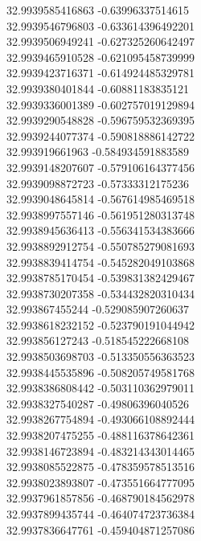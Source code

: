 {32.9939585416863	-0.63996337514615\\
32.9939546796803	-0.633614396492201\\
32.9939506949241	-0.627325260642497\\
32.9939465910528	-0.621095458739999\\
32.9939423716371	-0.614924485329781\\
32.9939380401844	-0.60881183835121\\
32.9939336001389	-0.602757019129894\\
32.9939290548828	-0.596759532369395\\
32.9939244077374	-0.590818886142722\\
32.993919661963	-0.584934591883589\\
32.9939148207607	-0.579106164377456\\
32.9939098872723	-0.57333312175236\\
32.9939048645814	-0.567614985469518\\
32.9938997557146	-0.561951280313748\\
32.9938945636413	-0.556341534383666\\
32.9938892912754	-0.550785279081693\\
32.9938839414754	-0.545282049103868\\
32.9938785170454	-0.539831382429467\\
32.9938730207358	-0.534432820310434\\
32.993867455244	-0.529085907260637\\
32.9938618232152	-0.523790191044942\\
32.993856127243	-0.518545222668108\\
32.9938503698703	-0.513350556363523\\
32.9938445535896	-0.508205749581768\\
32.9938386808442	-0.503110362979011\\
32.9938327540287	-0.49806396040526\\
32.9938267754894	-0.493066108892444\\
32.9938207475255	-0.488116378642361\\
32.9938146723894	-0.483214343014465\\
32.9938085522875	-0.478359578513516\\
32.9938023893807	-0.473551664777095\\
32.9937961857856	-0.468790184562978\\
32.9937899435744	-0.464074723736384\\
32.9937836647761	-0.459404871257086\\
}
